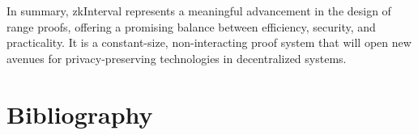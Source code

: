 \documentclass{iacrcc}
\theoremstyle{definition}
\begin{document}
In summary, zkInterval represents a meaningful advancement in the design of range proofs, offering a promising balance between efficiency, security, and practicality. It is a constant-size, non-interacting proof system that will open new avenues for privacy-preserving technologies in decentralized systems.

\section{Bibliography}


\end{document}

